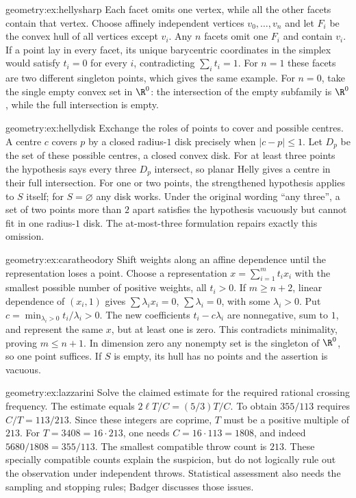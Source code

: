 \begin{solution}{geometry:ex:hellysharp}
\idea Each facet omits one vertex, while all the other facets contain that vertex.
\writeup Choose affinely independent vertices $v_0,\ldots,v_n$ and let $F_i$ be the convex hull of all vertices except $v_i$. Any $n$ facets omit one $F_i$ and contain $v_i$. If a point lay in every facet, its unique barycentric coordinates in the simplex would satisfy $t_i=0$ for every $i$, contradicting $\sum_i t_i=1$. For $n=1$ these facets are two different singleton points, which gives the same example. For $n=0$, take the single empty convex set in $\R^0$: the intersection of the empty subfamily is $\R^0$, while the full intersection is empty.
\end{solution}

\begin{solution}{geometry:ex:hellydisk}
\idea Exchange the roles of points to cover and possible centres.
\writeup A centre $c$ covers $p$ by a closed radius-$1$ disk precisely when $|c-p|\le1$. Let $D_p$ be the set of these possible centres, a closed convex disk. For at least three points the hypothesis says every three $D_p$ intersect, so planar Helly gives a centre in their full intersection. For one or two points, the strengthened hypothesis applies to $S$ itself; for $S=\varnothing$ any disk works. Under the original wording ``any three'', a set of two points more than $2$ apart satisfies the hypothesis vacuously but cannot fit in one radius-$1$ disk. The at-most-three formulation repairs exactly this omission.
\end{solution}

\begin{solution}{geometry:ex:caratheodory}
\idea Shift weights along an affine dependence until the representation loses a point.
\writeup Choose a representation $x=\sum_{i=1}^m t_ix_i$ with the smallest possible number of positive weights, all $t_i>0$. If $m\ge n+2$, linear dependence of $(x_i,1)$ gives $\sum\lambda_ix_i=0$, $\sum\lambda_i=0$, with some $\lambda_i>0$. Put $c=\min_{\lambda_i>0}t_i/\lambda_i>0$. The new coefficients $t_i-c\lambda_i$ are nonnegative, sum to $1$, and represent the same $x$, but at least one is zero. This contradicts minimality, proving $m\le n+1$. In dimension zero any nonempty set is the singleton of $\R^0$, so one point suffices. If $S$ is empty, its hull has no points and the assertion is vacuous.
\end{solution}

\begin{solution}{geometry:ex:lazzarini}
\idea Solve the claimed estimate for the required rational crossing frequency.
\writeup The estimate equals $2\ell T/C=(5/3)T/C$. To obtain $355/113$ requires $C/T=113/213$. Since these integers are coprime, $T$ must be a positive multiple of $213$. For $T=3408=16\cdot213$, one needs $C=16\cdot113=1808$, and indeed $5680/1808=355/113$. The smallest compatible throw count is $213$. These specially compatible counts explain the suspicion, but do not logically rule out the observation under independent throws. Statistical assessment also needs the sampling and stopping rules; Badger discusses those issues.
\end{solution}

